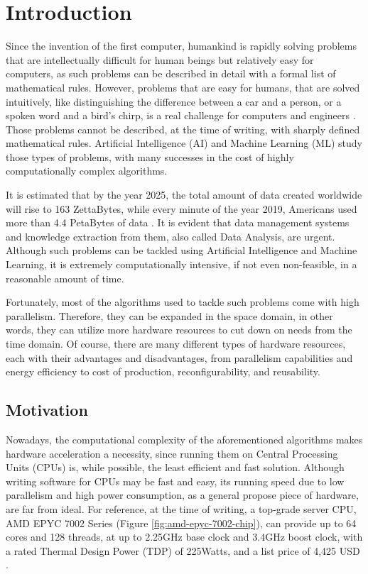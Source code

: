 \chapter{Introduction}

\label{Chapter-Introduction}

Since the invention of the first computer, humankind is rapidly solving problems that are intellectually difficult for human beings but relatively easy for computers, as such problems can be described in detail with a formal list of mathematical rules. However, problems that are easy for humans, that are solved intuitively, like distinguishing the difference between a car and a person, or a spoken word and a bird's chirp, is a real challenge for computers and engineers \cite{Goodfellow-et-al-2016}. Those problems cannot be described, at the time of writing, with sharply defined mathematical rules. Artificial Intelligence (AI) and Machine Learning (ML) study those types of problems, with many successes in the cost of highly computationally complex algorithms.

It is estimated that by the year 2025, the total amount of data created worldwide will rise to 163 ZettaBytes, while every minute of the year 2019, Americans used more than 4.4 PetaBytes of data \cite{Forbes-How-Much-Data-Is-Collected-Every-Minute-Of-The-Day}. It is evident that data management systems and knowledge extraction from them, also called Data Analysis, are urgent. Although such problems can be tackled using Artificial Intelligence and Machine Learning, it is extremely computationally intensive, if not even non-feasible, in a reasonable amount of time.

Fortunately, most of the algorithms used to tackle such problems come with high parallelism. Therefore, they can be expanded in the space domain, in other words, they can utilize more hardware resources to cut down on needs from the time domain. Of course, there are many different types of hardware resources, each with their advantages and disadvantages, from parallelism capabilities and energy efficiency to cost of production, reconfigurability, and reusability.

\section{Motivation}
Nowadays, the computational complexity of the aforementioned algorithms makes hardware acceleration a necessity, since running them on Central Processing Units (CPUs) is, while possible, the least efficient and fast solution. Although writing software for CPUs may be fast and easy, its running speed due to low parallelism and high power consumption, as a general propose piece of hardware, are far from ideal. For reference, at the time of writing, a top-grade server CPU, AMD EPYC 7002 Series (Figure \ref{fig:amd-epyc-7002-chip}), can provide up to 64 cores and 128 threads, at up to 2.25GHz base clock and 3.4GHz boost clock, with a rated Thermal Design Power (TDP) of 225Watts, and a list price of 4,425 USD \cite{AMD-EPYC-7002-Series-Processors}.


